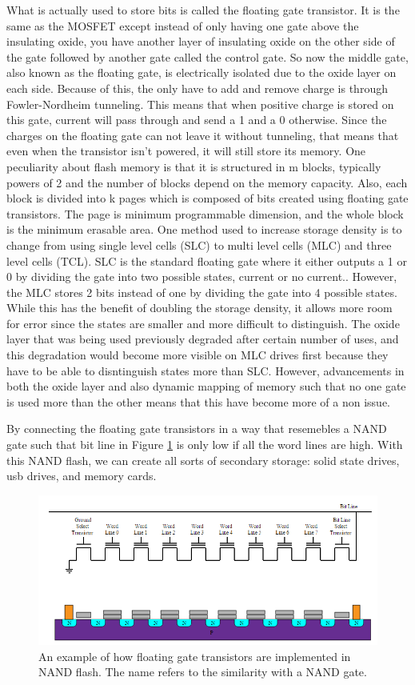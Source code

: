 \documentclass[ notitlepage, numerical, 11pt]{revtex4-1} %
\begin{document}
What is actually used to store bits is called the floating gate transistor. It is the same as the MOSFET except instead of only having one gate above the insulating oxide, you have another layer of insulating oxide on the other side of the gate followed by another gate called the control gate. So now the middle gate, also known as the floating gate, is electrically isolated due to the oxide layer on each side. Because of this, the only have to add and remove charge is through Fowler-Nordheim tunneling.  This means that when positive charge is stored on this gate, current will pass through and send a 1 and a 0 otherwise. Since the charges on the floating gate can not leave it without tunneling, that means that even when the transistor isn't powered, it will still store its memory. One peculiarity about flash memory is that it is structured in m blocks, typically powers of 2 and the number of blocks depend on the memory capacity. Also, each block is divided into k pages which is composed of bits created using floating gate transistors. The page is minimum programmable dimension, and the whole block is the minimum erasable area. One method used to increase storage density is to change from using single level cells (SLC) to multi level cells (MLC) and three level cells (TCL). SLC is the standard floating gate where it either outputs a 1 or 0 by dividing the gate into two possible states, current or no current.. However, the MLC stores 2 bits instead of one by dividing the gate into 4 possible states. While this has the benefit of doubling the storage density, it allows more room for error since the states are smaller and more difficult to distinguish. The oxide layer that was being used previously degraded after certain number of uses, and this degradation would become more visible on MLC drives first because they have to be able to disntinguish states more than SLC. However, advancements in both the oxide layer and also dynamic mapping of memory such that no one gate is used more than the other means that this have become more of a non issue.

By connecting the floating gate transistors in a way that resemebles a NAND gate such that bit line in Figure \ref{NAND} is only low if all the word lines are high. With this NAND flash, we can create all sorts of secondary storage: solid state drives, usb drives, and memory cards.

\begin{figure}[H]
\centerline{\includegraphics[scale=.45]{NAND.png}}
\caption{An example of how floating gate transistors are implemented in NAND flash. The name refers to the similarity with a NAND gate.}
\label{NAND}
\end{figure}
\end{document}
